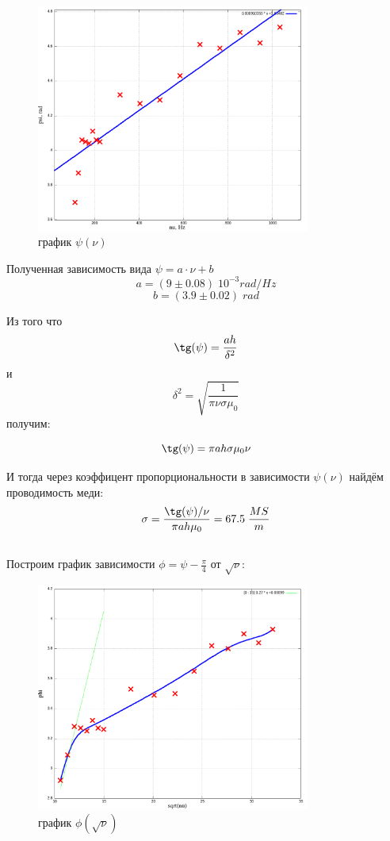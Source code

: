 \documentclass{article}
\begin{document}
\begin{figure}[H]
    \centering
    \includegraphics[width=0.8\textwidth]{psi.png}
    \caption{график \( \psi(\nu) \)}
\end{figure}

Полученная зависимость вида \( \psi = a\cdot\nu + b \)
\[ a = (9 \pm 0.08)\; 10^{-3} rad/Hz \]
\[ b = (3.9 \pm 0.02)\; rad \] 

Из того что 
\[ \tg(\psi) = \frac{ah}{\delta^2} \]
и
\[ \delta^2 = \sqrt{\frac{1}{\pi\nu\sigma\mu_0}} \]
получим:

\[ \tg(\psi) = \pi ah\sigma\mu_0\nu \]

И тогда через коэффицент пропорциональности в зависимости \( \psi(\nu) \) найдём проводимость меди:
\[ \sigma = \frac{\tg(\psi)/\nu}{\pi ah\mu_0} = 67.5\; \frac{MS}{m} \]

\subsection{}\label{sigma_3}

Построим график зависимости \( \phi = \psi - \frac{\pi}{4} \) от \(\sqrt{\nu}\):

\begin{figure}[H]
    \centering
    \includegraphics[width=0.8\textwidth]{phi.png}
    \caption{график \( \phi(\sqrt{\nu}) \)}
\end{figure}
\end{document}
